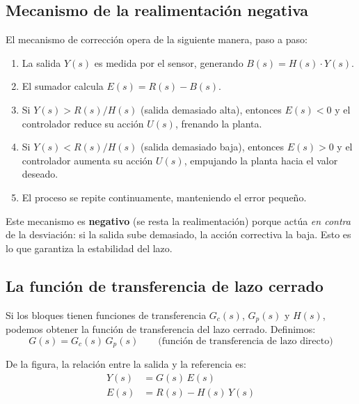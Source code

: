 \subsection{Mecanismo de la realimentación negativa}

El mecanismo de corrección opera de la siguiente manera, paso a paso:

\begin{enumerate}
  \item La salida $Y(s)$ es medida por el sensor, generando $B(s) = H(s) \cdot Y(s)$.
  \item El sumador calcula $E(s) = R(s) - B(s)$.
  \item Si $Y(s) > R(s)/H(s)$ (salida demasiado alta), entonces $E(s) < 0$ y el
    controlador reduce su acción $U(s)$, frenando la planta.
  \item Si $Y(s) < R(s)/H(s)$ (salida demasiado baja), entonces $E(s) > 0$ y el
    controlador aumenta su acción $U(s)$, empujando la planta hacia el valor deseado.
  \item El proceso se repite continuamente, manteniendo el error pequeño.
\end{enumerate}

Este mecanismo es \textbf{negativo} (se resta la realimentación) porque actúa
\textit{en contra} de la desviación: si la salida sube demasiado, la acción
correctiva la baja. Esto es lo que garantiza la estabilidad del lazo.


\subsection{La función de transferencia de lazo cerrado}

Si los bloques tienen funciones de transferencia $G_c(s)$, $G_p(s)$ y $H(s)$,
podemos obtener la función de transferencia del lazo cerrado. Definimos:
\begin{equation}
  G(s) = G_c(s)\,G_p(s)
  \qquad \text{(función de transferencia de lazo directo)}
  \label{eq:lazo-directo}
\end{equation}

De la figura, la relación entre la salida y la referencia es:
\begin{align}
  Y(s)   &= G(s)\,E(s) \label{eq:lc-1}\\
  E(s)   &= R(s) - H(s)\,Y(s) \label{eq:lc-2}
\end{align}

